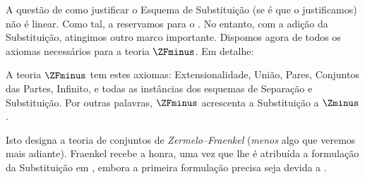 \documentclass[../../../include/open-logic-section]{subfiles}
\begin{document}

A questão de como justificar o Esquema de Substituição (se é que o
justificamos) não é linear. Como tal, a reservamos para o
. No entanto, com a adição da Substituição,
atingimos outro marco importante. Dispomos agora de todos os axiomas
necessários para a teoria $\ZFminus$. Em detalhe:

\begin{defn}
A teoria $\ZFminus$ tem estes axiomas: Extensionalidade, União, Pares,
Conjuntos das Partes, Infinito, e todas as instâncias dos esquemas de
Separação e Substituição. Por outras palavras, $\ZFminus$ acrescenta a
Substituição a $\Zminus$.
\end{defn}
\noindent
Isto designa a teoria de conjuntos de \emph{Zermelo--Fraenkel}
(\emph{menos} algo que veremos mais adiante). Fraenkel recebe a honra,
uma vez que lhe é atribuída a formulação da Substituição em
\citeyear{Fraenkel1922}, embora a primeira formulação precisa seja devida
a \citet{Skolem1922}.
\end{document}

